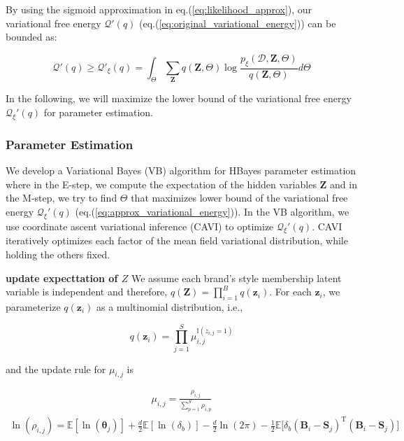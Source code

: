 By using the sigmoid approximation in eq.(\ref{eq:likelihood_approx}), our variational free energy $\mathcal{Q}'(q)$ (eq.(\ref{eq:original_variational_energy})) can be bounded as:

\begin{equation}
\label{eq:approx_variational_energy}
\mathcal{Q}'(q) \geq \mathcal{Q}'_{\xi}(q) = \int_\Theta \sum_{\bm{Z}} q(\bm{Z},\Theta) \log\frac{p_{\xi}(\mathcal{D},\bm{Z},\Theta)}{q(\bm{Z},\Theta)}d\Theta
\end{equation}

In the following, we will maximize the lower bound of the variational free energy $\mathcal{Q}_{\xi}'(q) $ for parameter estimation.

\subsubsection{Parameter Estimation}
\label{sec:param}

We develop a Variational Bayes (VB) algorithm for HBayes parameter estimation where in the E-step, we compute the expectation of the hidden variables $\mathbf{Z}$ and in the M-step, we try to find $\Theta$ that maximizes lower bound of the variational free energy $\mathcal{Q}_{\xi}'(q)$ (eq.(\ref{eq:approx_variational_energy})). In the VB algorithm, we use coordinate ascent variational inference (CAVI) \cite{bishop2006pattern} to optimize $\mathcal{Q}_{\xi}'(q)$. CAVI iteratively optimizes each factor of the mean field variational distribution, while holding the others fixed.

\noindent \textbf{update expecttation of $Z$}
We assume each brand's style membership latent variable is independent and therefore, $q(\mathbf{Z}) = \prod_{i=1}^B q(\mathbf{z}_i)$. For each $\mathbf{z}_i$, we parameterize $q(\mathbf{z}_i)$ as a multinomial distribution, i.e.,

$$q(\mathbf{z}_i) = \prod_{j=1}^S \mu_{i,j}^{\mathbb{I}(z_{i,j}=1)}$$

and the update rule for $\mu_{i,j}$ is  

\begin{align}
\mu_{i,j} =  \frac{\rho_{i,j}}{\sum_{p=1}^S\rho_{i,p}} 
\end{align}
\begin{align}
\ln(\rho_{i,j}) =  \mathbb{E}[\ln(\bm{\theta}_j)]+\frac{d}{2}\mathbb{E}[\ln(\delta_b)]-\frac{d}{2}\ln(2\pi) 
 -\frac{1}{2}\mathbb{E}\big[\delta_b(\mathbf{B}_i-\mathbf{S}_j)^\mathrm{T}(\mathbf{B}_i-\mathbf{S}_j)\big]
\end{align}

